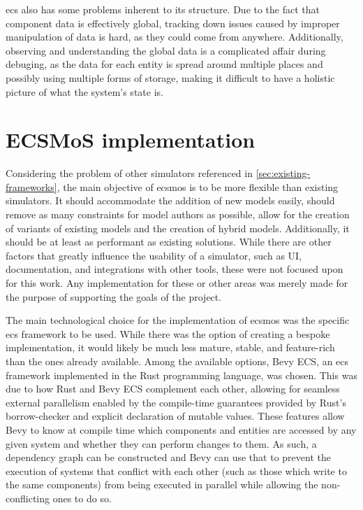\documentclass[twoside, 11pt]{article}
\begin{document}
\gls{ecs} also has some problems inherent to its structure. Due to the fact that component data is effectively global, tracking down issues caused by improper manipulation of data is hard, as they could come from anywhere. Additionally, observing and understanding the global data is a complicated affair during debuging, as the data for each entity is spread around multiple places and possibly using multiple forms of storage, making it difficult to have a holistic picture of what the system's state is.


\section{ECSMoS implementation} \label{sec:ecsmos-implementation}

Considering the problem of other simulators referenced in \autoref{sec:existing-frameworks}, the main objective of \gls{ecsmos} is to be more flexible than existing simulators. It should accommodate the addition of new models easily, should remove as many constraints for model authors as possible, allow for the creation of variants of existing models and the creation of hybrid models. Additionally, it should be at least as performant as existing solutions. While there are other factors that greatly influence the usability of a simulator, such as UI, documentation, and integrations with other tools, these were not focused upon for this work. Any implementation for these or other areas was merely made for the purpose of supporting the goals of the project.

The main technological choice for the implementation of \gls{ecsmos} was the specific \gls{ecs} framework to be used. While there was the option of creating a bespoke implementation, it would likely be much less mature, stable, and feature-rich than the ones already available. Among the available options, Bevy ECS, an \gls{ecs} framework implemented in the Rust programming language, was chosen. This was due to how Rust and Bevy ECS complement each other, allowing for seamless external parallelism enabled by the compile-time guarantees provided by Rust's borrow-checker and explicit declaration of mutable values. These features allow Bevy to know at compile time which components and entities are accessed by any given system and whether they can perform changes to them. As such, a dependency graph can be constructed and Bevy can use that to prevent the execution of systems that conflict with each other (such as those which write to the same components) from being executed in parallel while allowing the non-conflicting ones to do so.
\end{document}
